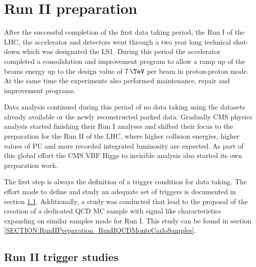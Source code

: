 \chapter{Run II preparation}
\label{CHAPTER:RunIIPreparation}



After the successful completion of the first data taking period, the  Run I of the \gls{LHC}, the accelerator and detectors went through a two year long technical shut-down which was designated the \gls{LS1}. During this period the accelerator completed a consolidation and improvement program to allow a ramp up of the beams energy up to the design value of $7\,\TeV$ per beam in proton-proton mode. At the same time the experiments also performed maintenance, repair and improvement programs. 

Data analysis continued during this period of no data taking using the datasets already available or the newly reconstructed parked data. Gradually \gls{CMS} physics analysis started finishing their Run I analyses and shifted their focus to the preparation for the Run II of the \gls{LHC}, where higher collision energies, higher values of \gls{PU} and more recorded integrated luminosity are expected. As part of this global effort the \gls{CMS} \gls{VBF} Higgs to invisible analysis also started its own preparation work. 

The first step is always the definition of a trigger condition for data taking. The effort made to define and study an adequate set of triggers is documented in section \ref{SECTION:RunIITriggerStudies}. Additionally, a study was conducted that lead to the proposal of the creation of a dedicated \gls{QCD} \gls{MC} sample with signal like characteristics expanding on similar samples made for Run I. This study can be found in section \ref{SECTION:RunIIPreparation_RunIIQCDMonteCarloSamples}.

\section{Run II trigger studies}
\label{SECTION:RunIITriggerStudies}

